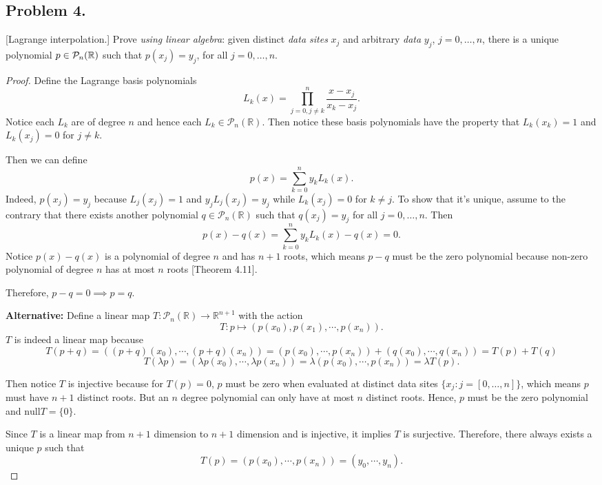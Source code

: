 \documentclass{article}
\begin{document}
\subsection*{Problem 4.}
[Lagrange interpolation.] Prove {\it using linear algebra}: given distinct {\it data sites} $x_j$ 
and arbitrary {\it data} $y_j$, $j=0,\ldots, n$, there is a unique polynomial  $p\in {\cal P}_n(\mathbb{R})$ 
such that $p(x_j)=y_j$, for all $j=0,\ldots, n$. 
\begin{proof}
    Define the Lagrange basis polynomials 
    $$L_k(x)=\prod_{j=0,j\neq k}^{n}\frac{x-x_j}{x_k-x_j}.$$
    Notice each $L_k$ are of degree $n$ and hence each $L_k\in\mathcal{P}_n(\mathbb{R})$.
    Then notice these basis polynomials have the property that $L_k(x_k)=1$ and $L_k(x_j)=0$ for 
    $j\neq k$. 
    
    Then we can define 
    $$p(x)=\sum_{k=0}^{n}y_kL_k(x).$$
    Indeed, $p(x_j)=y_j$ because $L_j(x_j)=1$ and $y_jL_j(x_j)=y_j$ while $L_k(x_j)=0$ for $k\neq j$.
    To show that it's unique, assume to the contrary that there exists another polynomial
    $q\in\mathcal{P}_n(\mathbb{R})$ such that $q(x_j)=y_j$ for all $j=0,\ldots,n$. Then
    $$p(x)-q(x)=\sum_{k=0}^{n}y_kL_k(x)-q(x)=0.$$
    Notice $p(x)-q(x)$ is a polynomial of degree $n$ and has $n+1$ roots, which means 
    $p-q$ must be the zero polynomial because non-zero polynomial of degree $n$ has at most $n$ roots
    [Theorem 4.11].

    Therefore, $p-q=0\implies p=q$.

    \textbf{Alternative:} Define a linear map $T:\mathcal{P}_n(\mathbb{R})\to \mathbb{R}^{n+1}$ with 
    the action 
    $$T:p\mapsto (p(x_0), p(x_1), \cdots, p(x_n)).$$
    $T$ is indeed a linear map because 
    $$T(p+q) = ((p+q)(x_0), \cdots, (p+q)(x_n)) = (p(x_0), \cdots, p(x_n))+(q(x_0),\cdots, q(x_n))
    =T(p)+T(q)$$
    $$T(\lambda p) = (\lambda p(x_0),\cdots, \lambda p(x_n))=\lambda (p(x_0),\cdots, p(x_n))=
    \lambda T(p).$$
    
    Then notice $T$ is injective because for $T(p)=0$, $p$ must be zero when evaluated at distinct 
    data sites $\{x_j:j=[0,\dots,n]\}$, which means $p$ must have $n+1$ distinct roots.
    But an $n$ degree polynomial can only have at most $n$ distinct roots. Hence, $p$ must be the 
    zero polynomial and $\mathrm{null}T = \{0\}$. 
    
    Since $T$ is a linear map from $n+1$ dimension to $n+1$ dimension and is injective, it implies 
    $T$ is surjective. Therefore, there always exists a unique $p$ such that 
    $$T(p)=(p(x_0),\cdots,p(x_n))=(y_0, \cdots, y_n).$$
\end{proof}
\end{document}

